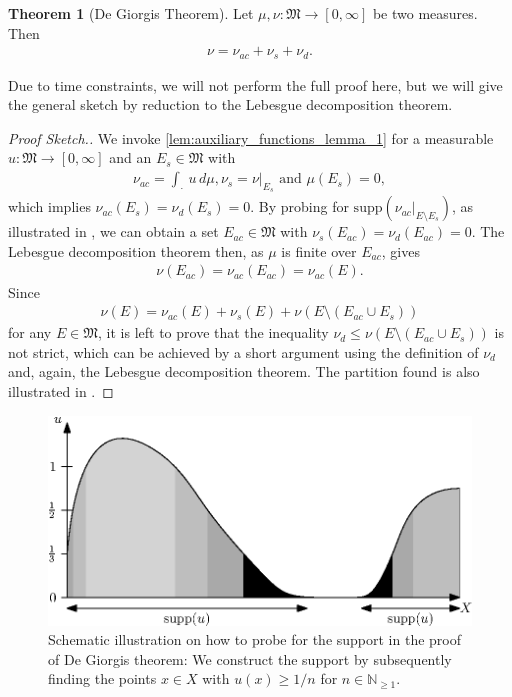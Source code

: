 \documentclass[10pt, leqno]{amsart}
\theoremstyle{definition}
\newtheorem{theorem}{Theorem}[section]
\theoremstyle{remark}
\begin{document}
    \begin{theorem}[De Giorgis Theorem]
        Let \(\mu, \nu\colon \mathfrak{M} \to [0, \infty]\) be two measures. Then
        \begin{align}
            \nu = \nu_{ac} + \nu_s + \nu_d.
        \end{align}
    \end{theorem}

    Due to time constraints, we will not perform the full proof here, but we will give the general sketch by reduction to the Lebesgue decomposition theorem.

    \begin{proof}[Proof Sketch.]
        We invoke  \ref{lem:auxiliary_functions_lemma_1} for a measurable \(u\colon \mathfrak{M} \to [0, \infty]\) and an \(E_s \in \mathfrak{M}\) with
        \begin{align}
            \nu_{ac} = \int_{\cdot} \, u \, d\mu, \nu_s = \nu|_{E_s} \text{ and } \mu(E_s) = 0,
        \end{align}
        which implies \(\nu_{ac}(E_s) = \nu_d(E_s) = 0\). By probing for \(\text{supp}(\nu_{ac}|_{E \setminus E_s})\), as illustrated in , we can obtain a set \(E_{ac} \in \mathfrak{M}\) with \(\nu_s(E_{ac}) = \nu_d(E_{ac}) = 0\). The Lebesgue decomposition theorem then, as \(\mu\) is finite over \(E_{ac}\), gives
        \begin{align}
            \nu(E_{ac}) = \nu_{ac}(E_{ac}) = \nu_{ac}(E).
        \end{align}
        Since
        \begin{align}
            \nu(E) = \nu_{ac}(E) + \nu_s(E) + \nu(E \setminus (E_{ac} \cup E_s))
        \end{align}
        for any \(E \in \mathfrak{M}\), it is left to prove that the inequality \(\nu_d \leq \nu(E \setminus (E_{ac} \cup E_s))\) is not strict, which can be achieved by a short argument using the definition of \(\nu_d\) and, again, the Lebesgue decomposition theorem. The partition found is also illustrated in .
    \end{proof}

    \begin{figure}[!hbtp]
        \centering
        \includegraphics[width=0.75\linewidth]{img/degiorgi.eps}
        \caption{Schematic illustration on how to probe for the support in the proof of De Giorgis theorem: We construct the support by subsequently finding the points \(x \in X\) with \(u(x) \geq 1/n\) for \(n \in \mathbb{N}_{\geq 1}\).}
        \label{fig:degiorgi_decomposition_illustration}
    \end{figure}
\end{document}
